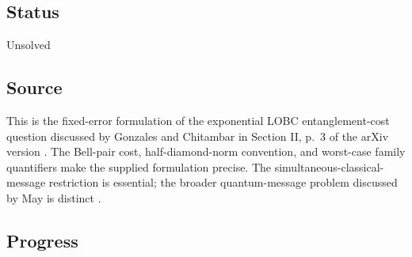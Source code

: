 \subsection*{Status}

Unsolved

\subsection*{Source}

This is the fixed-error formulation of the exponential LOBC entanglement-cost question discussed by Gonzales and Chitambar in Section II, p.~3 of the arXiv version . The Bell-pair cost, half-diamond-norm convention, and worst-case family quantifiers make the supplied formulation precise. The simultaneous-classical-message restriction is essential; the broader quantum-message problem discussed by May is distinct .

\subsection*{Progress}


